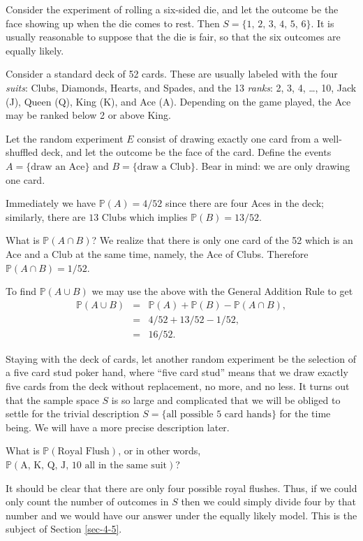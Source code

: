\documentclass[captions=tableheading]{scrbook}
\begin{document}
\begin{example}
Consider the experiment of rolling a six-sided die, and let the outcome be the face showing up when the die comes to rest. Then \( S = \{ 1,\,2,\,3,\,4,\,5,\,6 \} \). It is usually reasonable to suppose that the die is fair, so that the six outcomes are equally likely.
\end{example}

\begin{example}
Consider a standard deck of 52 cards. These are usually labeled with the four \emph{suits}: Clubs, Diamonds, Hearts, and Spades, and the 13 \emph{ranks}: 2, 3, 4, \ldots{}, 10, Jack (J), Queen (Q), King (K), and Ace (A). Depending on the game played, the Ace may be ranked below 2 or above King. 

Let the random experiment \(E\) consist of drawing exactly one card from a well-shuffled deck, and let the outcome be the face of the card. Define the events \( A = \{ \mbox{draw an Ace} \} \) and \( B = \{ \mbox{draw a Club} \} \). Bear in mind: we are only drawing one card.

Immediately we have \(\mathbb{P}(A)=4/52\) since there are four Aces in the deck; similarly, there are \(13\) Clubs which implies \(\mathbb{P}(B)=13/52\).

What is \(\mathbb{P}(A\cap B)\)? We realize that there is only one card of the 52 which is an Ace and a Club at the same time, namely, the Ace of Clubs. Therefore \(\mathbb{P}(A\cap B)=1/52\).

To find \(\mathbb{P}(A\cup B)\) we may use the above with the General Addition Rule to get
\begin{eqnarray*}
\mathbb{P}(A\cup B) & = & \mathbb{P}(A)+\mathbb{P}(B)-\mathbb{P}(A\cap B),\\
 & = & 4/52+13/52-1/52,\\
 & = & 16/52.
\end{eqnarray*}

\end{example}

\begin{example}
Staying with the deck of cards, let another random experiment be the selection of a five card stud poker hand, where ``five card stud'' means that we draw exactly five cards from the deck without replacement, no more, and no less. It turns out that the sample space \(S\) is so large and complicated that we will be obliged to settle for the trivial description \( S = \{ \mbox{all possible 5 card hands} \} \) for the time being. We will have a more precise description later.

What is \(\mathbb{P}(\mbox{Royal Flush})\), or in other words, \(\mathbb{P}(\mbox{A, K, Q, J, 10 all in the same suit})\)? 

It should be clear that there are only four possible royal flushes. Thus, if we could only count the number of outcomes in \(S\) then we could simply divide four by that number and we would have our answer under the equally likely model. This is the subject of Section \ref{sec-4-5}.

\end{example}
\end{document}
